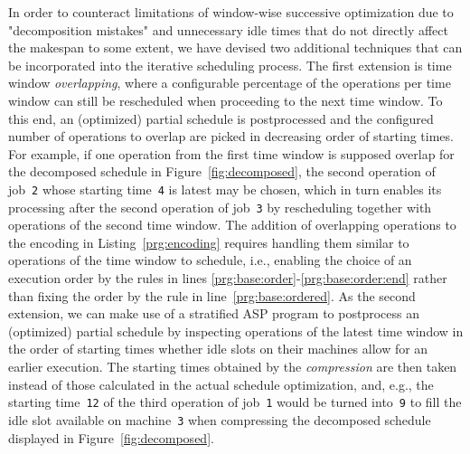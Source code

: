 \documentclass{tlp} %
\begin{document}
In order to counteract limitations of window-wise successive optimization
due to "decomposition mistakes" and unnecessary idle times that do not directly
affect the makespan to some extent,
we have devised two additional techniques that can be incorporated into the
iterative scheduling process.
The first extension is time window \emph{overlapping}, where a configurable percentage
of the operations per time window can still be rescheduled when proceeding
to the next time window.
To this end, an (optimized) partial schedule is postprocessed and the configured
number of operations to overlap are picked in decreasing order of starting times.
For example, if one operation from the first time window is supposed overlap for the
decomposed schedule in Figure~\ref{fig:decomposed}, the second operation of job~\lstinline{2}
whose starting time~\lstinline{4} is latest may be chosen,
which in turn enables its processing after the second operation of job~\lstinline{3}
by rescheduling together with operations of the second time window.
The addition of overlapping operations to the encoding in Listing~\ref{prg:encoding}
requires handling them similar to operations of the time window to schedule,
i.e., enabling the choice of an execution order by the rules in lines
\ref{prg:base:order}-\ref{prg:base:order:end} rather than fixing the order
by the rule in line~\ref{prg:base:ordered}.
As the second extension, we can make use of a stratified ASP program to
postprocess an (optimized) partial schedule by inspecting operations of the
latest time window in the order of starting times whether idle slots
on their machines allow for an earlier execution.
The starting times obtained by the \emph{compression} are then taken instead
of those calculated in the actual schedule optimization, and, e.g.,
the starting time~\lstinline{12} of the third operation of job~\lstinline{1}
would be turned into~\lstinline{9} to fill the idle slot available on
machine~\lstinline{3} when compressing the decomposed schedule displayed in Figure~\ref{fig:decomposed}.
\end{document}
